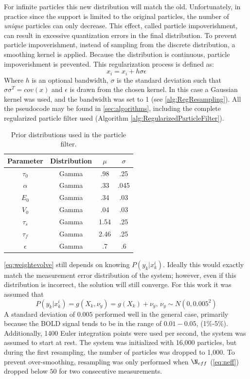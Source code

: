 \documentclass[journal]{./IEEEtran}
\begin{document}
For infinite particles this new distribution will match the old.
Unfortunately, in practice since the support is
limited to the original particles, the number of \emph{unique} 
particles can only decrease.
This effect, called particle impoverishment, can result in 
excessive quantization errors in the final distribution. 
To prevent particle impoverishment, instead of sampling from the
discrete distribution, a smoothing kernel is applied.
Because the distribution is continuous, particle impoverishment
is prevented. This regularization process is defined as:
\begin{equation}
x_i = x_i + h\sigma \epsilon
\end{equation}
Where $h$ is an optional bandwidth, $\sigma$ is the standard 
deviation such that $\sigma \sigma^T = cov(x)$
and $\epsilon$ is drawn from the chosen kernel. In this case
a Gaussian kernel was used, and the bandwidth was set to 1
(see \autoref{alg:RegResampling}). All the 
pseudocode may be found in \autoref{sec:algorithms},
including the complete regularized particle filter used
(Algorithm \autoref{alg:RegularizedParticleFilter}).
\begin{table}[t]
\centering
\begin{tabular}{|c || c | c | c |}
\hline
Parameter & Distribution & $\mu$ & $\sigma$ \\
\hline
$\tau_0$ & Gamma & .98 & .25 \\
$\alpha$ & Gamma & .33 & .045\\
$E_0$    & Gamma & .34 & .03  \\
$V_0$    & Gamma & .04 & .03 \\
$\tau_s$ & Gamma & 1.54  & .25\\
$\tau_f$ & Gamma & 2.46  & .25\\
$\epsilon$ & Gamma & .7  & .6 \\
\hline
\end{tabular}
\caption{Prior distributions used in the particle filter.}
\label{tab:Prior}
\end{table}
\autoref{eq:weightevolve} still depends on knowing
$P(y_k| x^i_k)$. Ideally this would exactly match the
measurement error distribution of the system; however,
even if this distribution is incorrect, the solution will
still converge. For this work it was assumed that
\begin{equation}
P(y_k | x^i_k) = g(X_k, \nu_y) = g(X_k) + \nu_y\text{, }\nu_y \sim N(0, 0.005^2)
\end{equation}
A standard deviation of $0.005$ performed well in the general case, primarily
because the BOLD signal tends to be in the range of $0.01-0.05$, (1\%-5\%).
Additionally, 1400 Euler integration points were used per second, 
the system was assumed to start at rest. The system was initialized
with 16,000 particles, but during the first resampling, the number
of particles was dropped to 1,000. To prevent over-smoothing, resampling
was only performed when $\N_{eff}$ (\autoref{eq:neff}) dropped below
$50$ for two consecutive measurements. 
\end{document}
